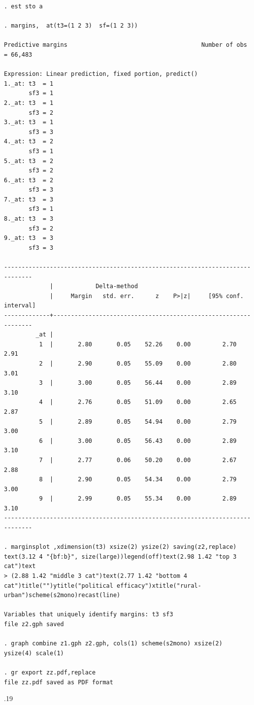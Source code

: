 \documentclass[10pt, letterpaper]{article}
\begin{document}
\begin{spacing}{1.4}
\begin{scriptsize}
\begin{spacing}{.19}
\begin{verbatim}
. est sto a                

. margins,  at(t3=(1 2 3)  sf=(1 2 3))

Predictive margins                                      Number of obs = 66,483

Expression: Linear prediction, fixed portion, predict()
1._at: t3  = 1
       sf3 = 1
2._at: t3  = 1
       sf3 = 2
3._at: t3  = 1
       sf3 = 3
4._at: t3  = 2
       sf3 = 1
5._at: t3  = 2
       sf3 = 2
6._at: t3  = 2
       sf3 = 3
7._at: t3  = 3
       sf3 = 1
8._at: t3  = 3
       sf3 = 2
9._at: t3  = 3
       sf3 = 3

------------------------------------------------------------------------------
             |            Delta-method
             |     Margin   std. err.      z    P>|z|     [95% conf. interval]
-------------+----------------------------------------------------------------
         _at |
          1  |       2.80       0.05    52.26    0.00         2.70        2.91
          2  |       2.90       0.05    55.09    0.00         2.80        3.01
          3  |       3.00       0.05    56.44    0.00         2.89        3.10
          4  |       2.76       0.05    51.09    0.00         2.65        2.87
          5  |       2.89       0.05    54.94    0.00         2.79        3.00
          6  |       3.00       0.05    56.43    0.00         2.89        3.10
          7  |       2.77       0.06    50.20    0.00         2.67        2.88
          8  |       2.90       0.05    54.34    0.00         2.79        3.00
          9  |       2.99       0.05    55.34    0.00         2.89        3.10
------------------------------------------------------------------------------

. marginsplot ,xdimension(t3) xsize(2) ysize(2) saving(z2,replace) text(3.12 4 "{bf:b}", size(large))legend(off)text(2.98 1.42 "top 3 cat")text
> (2.88 1.42 "middle 3 cat")text(2.77 1.42 "bottom 4 cat")title("")ytitle("political efficacy")xtitle("rural-urban")scheme(s2mono)recast(line)

Variables that uniquely identify margins: t3 sf3
file z2.gph saved

. graph combine z1.gph z2.gph, cols(1) scheme(s2mono) xsize(2) ysize(4) scale(1)

. gr export zz.pdf,replace
file zz.pdf saved as PDF format
\end{verbatim}
\end{spacing}{.19}
\end{scriptsize}


\end{spacing}
\end{document}
